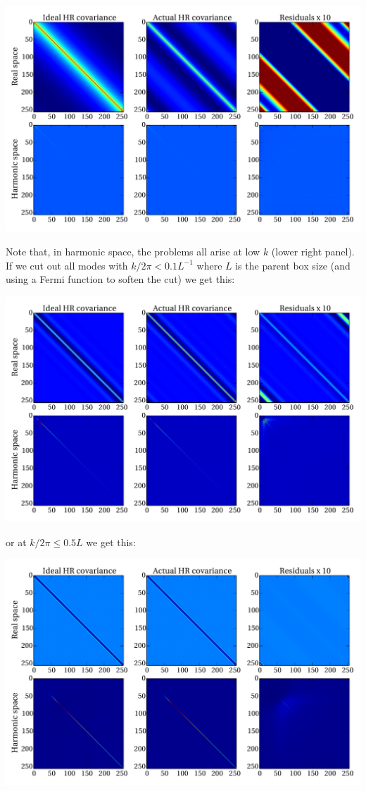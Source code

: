 \documentclass[11pt,a4paper,preprint]{aastex}
\begin{document}
\includegraphics[width=\textwidth]{figs/zoom_test1.pdf}

Note that, in harmonic space, the problems all arise at low $k$ (lower
right panel).
If we cut out all modes with $k/2\pi<0.1L^{-1}$ where $L$ is the
parent box size (and using a Fermi function to soften the cut) we get
this:

\includegraphics[width=\textwidth]{figs/zoom_test2.pdf}

or at $k/2\pi \le 0.5L$ we get this:

\includegraphics[width=\textwidth]{figs/zoom_test3.pdf}
\end{document}

